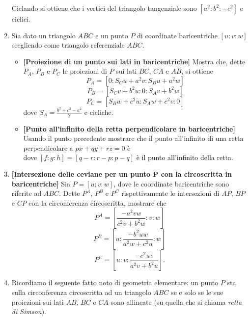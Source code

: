 \begin{enumerate}
	Ciclando si ottiene che i vertici del triangolo tangenziale sono $[a^2:b^2:-c^2]$ e ciclici.
	\item Sia dato un triangolo $ABC$ e un punto $P$ di coordinate baricentriche $[u:v:w]$ scegliendo come triangolo referenziale $ABC$.
		\begin{itemize}
			\item \textbf{[Proiezione di un punto sui lati in baricentriche]} Mostra che, dette $P_A$, $P_B$ e $P_C$ le proiezioni di $P$ sui lati $BC$, $CA$ e $AB$, si ottiene
			$$
			P_A = [0: S_Cu+a^2v:S_Bu+a^2w]
			$$
			$$
			P_B = [S_Cv+b^2u: 0: S_Av+b^2w]
			$$
			$$
			P_C = [S_Bw+c^2u: S_Aw+c^2v: 0]
			$$			
			dove $S_A=\displaystyle\frac{b^2+c^2-a^2}{2}$ e cicliche.
			\item  \textbf{[Punto all'infinito della retta perpendicolare in baricentriche]} Usando il punto precedente mostrare che 
			il punto all'infinito di una retta perpendicolare a $px+qy+rz=0$ è
			\begin{equation}
			[S_Bg-S_Ch:S_Ch-S_Af:S_Af-S_Bg]
			\end{equation}
			dove $[f:g:h]=[q-r:r-p:p-q]$ è il punto all'infinito della retta.
		\end{itemize}
	\item \textbf{[Intersezione delle ceviane per un punto P con la circoscritta in baricentriche]} Sia $P=[u:v:w]$, dove le coordinate baricentriche 
	sono riferite ad $ABC$. Dette $P^A$, $P^B$ e $P^C$ rispettivamente le intersezioni di $AP$, $BP$ e $CP$ con la circonferenza circoscritta, mostrare che 
	$$
	P^A=\left[\displaystyle\frac{-a^2vw}{c^2v+b^2w}:v:w\right]
	$$
	$$
	P^B=\left[u:\displaystyle\frac{-b^2uw}{a^2w+c^2u}:w\right]
	$$
	$$
	P^C=\left[u:v:\displaystyle\frac{-c^2uv}{a^2v+b^2u}\right].
	$$
	\item Ricordiamo il seguente fatto noto di geometria elementare: un punto $P$ sta sulla circonferenza circoscritta ad un triangolo $ABC$ se e solo se le sue proiezioni sui lati $AB$, $BC$ e $CA$ sono allineate (su quella che si chiama \textit{retta di Simson}). 
	

\end{enumerate}
